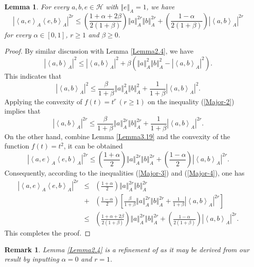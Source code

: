 \documentclass{article}
\newcommand{\bra}[1]{\left(#1\right)}
\newcommand{\sbra}[1]{\left[#1\right]}
\newcommand{\seqA}[1]{{\left<#1\right>}_{A}}
\newcommand{\normA}[1]{{\left\Vert#1\right\Vert}_{A}}
\newcommand{\abs}[1]{\left\vert#1\right\vert}
\newcommand {\h}{\mathcal{H}}
\newtheorem{lemma}[theorem]{Lemma}
\newtheorem{remark}[theorem]{Remark}
\begin{document}
\begin{lemma}\label{Lemma2.5} For every $a,b,e\in\h$ with $\normA{e}=1$, we have
\begin{equation}\label{Major-1}
  \abs{\seqA{a,e}\seqA{e,b}}^{2r}\leq \bra{\frac{1+\alpha+2\beta}{2(1+\beta)}}\normA{a}^{2r}\normA{b}^{2r}+\bra{\frac{1-\alpha}{2(1+\beta)}}\abs{\seqA{a,b}}^{2r}
\end{equation}
for every $\alpha\in [0,1]$, $r\geq 1$  and $\beta\geq 0$.
\end{lemma}
\begin{proof} By similar discussion with Lemma \ref{Lemma2.4}, we have
$$\abs{\seqA{a,b}}^2\leq \abs{\seqA{a,b}}^2+\beta\bra{\normA{a}^2\normA{b}^2-\abs{\seqA{a,b}}^2}. $$
This indicates that
\begin{equation}\label{Major-2}
  \abs{\seqA{a,b}}^2\leq \frac{\beta}{1+\beta}\normA{a}^2\normA{b}^2+\frac{1}{1+\beta}\abs{\seqA{a,b}}^2.
\end{equation}
Applying the convexity of $f(t)=t^r\,(r\geq1)$ on the inequality (\ref{Major-2}) implies that
\begin{equation}\label{Major-3}
  \abs{\seqA{a,b}}^{2r}\leq \frac{\beta}{1+\beta}\normA{a}^{2r}\normA{b}^{2r}+\frac{1}{1+\beta}\abs{\seqA{a,b}}^{2r}.
\end{equation}
On the other hand, combine Lemma \ref{Lemma3.19} and the convexity of the function $f(t)=t^2$, it
can be obtained
\begin{equation}\label{Major-4}
  \abs{\seqA{a,e}\seqA{e,b}}^{2r}\leq \bra{\frac{1+\alpha}{2}}\normA{a}^{2r}\normA{b}^{2r}+\bra{\frac{1-\alpha}{2}}\abs{\seqA{a,b}}^{2r}.
\end{equation}
Consequently, according to the inequalities (\ref{Major-3}) and (\ref{Major-4}), one has
\begin{eqnarray*}
   \abs{\seqA{a,e}\seqA{e,b}}^{2r}&\leq& \bra{\frac{1+\alpha}{2}}\normA{a}^{2r}\normA{b}^{2r} \\
   &+& \bra{\frac{1-\alpha}{2}}\sbra{\frac{\beta}{1+\beta}\normA{a}^{2r}\normA{b}^{2r}+\frac{1}{1+\beta}\abs{\seqA{a,b}}^{2r}}\\
   &\leq&\bra{\frac{1+\alpha+2\beta}{2(1+\beta)}}\normA{a}^{2r}\normA{b}^{2r}+\bra{\frac{1-\alpha}{2(1+\beta)}}\abs{\seqA{a,b}}^{2r}.
\end{eqnarray*}
This completes the proof.
\end{proof}
\begin{remark} Lemma \ref{Lemma2.4} is a refinement of \cite[Lemma 2.3]{QHC} as it may be derived from our result by inputting $\alpha=0$ and $r=1$.
\end{remark}
\end{document}
